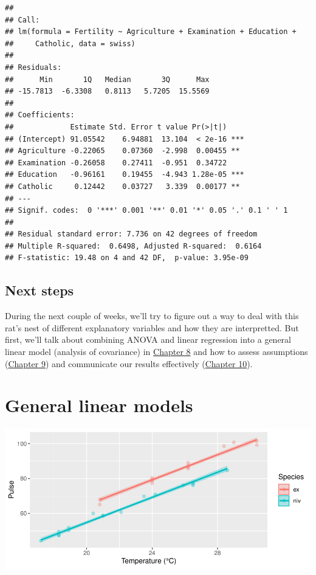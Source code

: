 \documentclass[
]{book}
\begin{document}
\begin{verbatim}
## 
## Call:
## lm(formula = Fertility ~ Agriculture + Examination + Education + 
##     Catholic, data = swiss)
## 
## Residuals:
##      Min       1Q   Median       3Q      Max 
## -15.7813  -6.3308   0.8113   5.7205  15.5569 
## 
## Coefficients:
##             Estimate Std. Error t value Pr(>|t|)    
## (Intercept) 91.05542    6.94881  13.104  < 2e-16 ***
## Agriculture -0.22065    0.07360  -2.998  0.00455 ** 
## Examination -0.26058    0.27411  -0.951  0.34722    
## Education   -0.96161    0.19455  -4.943 1.28e-05 ***
## Catholic     0.12442    0.03727   3.339  0.00177 ** 
## ---
## Signif. codes:  0 '***' 0.001 '**' 0.01 '*' 0.05 '.' 0.1 ' ' 1
## 
## Residual standard error: 7.736 on 42 degrees of freedom
## Multiple R-squared:  0.6498,	Adjusted R-squared:  0.6164 
## F-statistic: 19.48 on 4 and 42 DF,  p-value: 3.95e-09
\end{verbatim}

\hypertarget{next7}{%
\section{Next steps}\label{next7}}

During the next couple of weeks, we'll try to figure out a way to deal with this rat's nest of different explanatory variables and how they are interpretted. But first, we'll talk about combining ANOVA and linear regression into a general linear model (analysis of covariance) in \protect\hyperlink{Chapter8}{Chapter 8} and how to assess assumptions (\protect\hyperlink{Chapter9}{Chapter 9}) and communicate our results effectively (\protect\hyperlink{Chapter10}{Chapter 10}).

\hypertarget{Chapter8}{%
\chapter{General linear models}\label{Chapter8}}

\includegraphics{worstr_files/figure-latex/unnamed-chunk-206-1.pdf}
\end{document}
